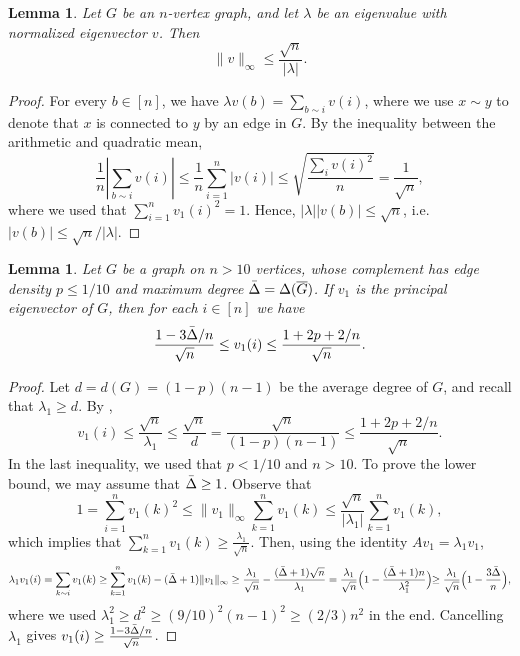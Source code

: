 \documentclass[11pt]{article}
\theoremstyle{plain}
\newtheorem{lemma}[theorem]{Lemma}
\theoremstyle{definition}
\begin{document}
\begin{lemma}\label{lemma:smooth_eigenvectors}
Let $G$ be an $n$-vertex graph, and let $\lambda$ be an eigenvalue with normalized eigenvector $v$. Then
$$\|v\|_{\infty}\leq \frac{\sqrt{n}}{|\lambda|}.$$
\end{lemma}

\begin{proof}
    For every $b\in [n]$, we have $\lambda v(b)=\sum_{b\sim i}v(i)$, where we use $x\sim y$ to denote that $x$ is connected to $y$ by an edge in $G$. 
    By the inequality between the arithmetic and quadratic mean,  
    $$\frac{1}{n}\left|\sum_{b\sim i}v(i)\right|\leq \frac{1}{n}\sum_{i=1}^n |v(i)|\leq \sqrt{\frac{\sum_i v(i)^2}{n}}=\frac{1}{\sqrt{n}},$$ where we used that $\sum_{i=1}^nv_1(i)^2=1$. 
    Hence, $|\lambda| |v(b)|\leq \sqrt{n}$, i.e. $|v(b)| \le \sqrt{n}/|\lambda|$.
\end{proof}

\begin{lemma}\label{lemma:max_entry}
    Let $G$ be a graph on $n > 10$ vertices, whose complement has edge density $p\leq 1/10$ and maximum degree $\Bar{\Delta}=\Delta(\overline{G})$. If $v_1$ is the principal eigenvector of $G$, then for each $i\in [n]$ we have \[\frac{1-3\Bar{\Delta}/n}{\sqrt{n}} \leq v_1(i)\leq \frac{1+2p+2/n}{\sqrt{n}}.\]
\end{lemma}
\begin{proof}
    Let $d=d(G)=(1-p)(n-1)$ be the average degree of $G$, and recall that $\lambda_1\geq d$. 
    By ,
    $$v_1(i)\leq \frac{\sqrt{n}}{\lambda_1}\leq \frac{\sqrt{n}}{d}=\frac{\sqrt{n}}{(1-p)(n-1)}\leq \frac{1+2p+2/n}{\sqrt{n}}.$$
    In the last inequality, we used that $p<1/10$ and $n > 10$.
    To prove the lower bound, we may assume that $\Bar{\Delta} \ge 1$.
    Observe that 
    $$1=\sum_{i=1}^n v_1(k)^2\leq \|v_1\|_{\infty} \sum_{k=1}^n v_1(k)\le \frac{\sqrt{n}}{|\lambda_1|}\sum_{k=1}^n v_1(k),$$
    which implies that $\sum_{k=1}^n v_1(k)\geq \frac{\lambda_1}{\sqrt{n}}$. 
    Then, using the identity $Av_1=\lambda_1 v_1$,
    $$  \lambda_1v_1(i)
        =\sum_{k\sim i}v_1(k)
        \geq \sum_{k=1}^nv_1(k)- (\Bar{\Delta}+1) \|v_1\|_{\infty}
        \geq\frac{\lambda_1}{\sqrt{n}}-\frac{(\Bar{\Delta}+1)\sqrt{n}}{\lambda_1}
        = \frac{\lambda_1}{\sqrt{n}}\Big(1-\frac{(\Bar{\Delta}+1)n}{\lambda_1^2}\Big)\!\!
        \geq \frac{\lambda_1}{\sqrt{n}}\Big(1-\frac{3\Bar{\Delta}}{n}\Big),$$
    where we used $\lambda_1^2\geq d^2\geq (9/10)^2(n-1)^2\ge (2/3)n^2$ in the end. 
    Cancelling $\lambda_1$ gives $v_1(i)\geq \frac{1-3\Bar{\Delta}/n}{\sqrt{n}}$.
\end{proof}
\end{document}
